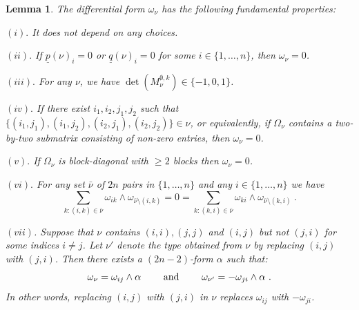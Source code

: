 \documentclass[10pt]{amsart}
\newcommand{\pp}{{\underline{p}}}
\newcommand{\qq}{{\underline{q}}}
\theoremstyle{plain}
\newtheorem{lem}[thm]{Lemma}
\newcommand{\0}{\color{blue}{\mathsf{0}}}
\begin{document}
\begin{lem}\label{onulem} The differential form $\omega_\nu$ has the following fundamental properties:

 $(i).$ It does not depend on any choices. 

 $(ii).$ If $\pp(\nu)_i=0$ or $\qq(\nu)_i=0$ for some $i\in\{1,\ldots,n\}$,
 then $\omega_\nu=0$.

 $(iii).$ For any $\nu$, we have $\det(M_{\nu}^{\emptyset,k})\in\{-1,0,1\}$.
 
 $(iv).$ If there exist $i_1,i_2, j_1,j_2$ such that 
$ \{ (i_1,j_1), (i_1,j_2), (i_2,j_1), (i_2,j_2)\} \in \nu $, or equivalently, if 
 $\Omega_\nu$ contains a two-by-two submatrix consisting of non-zero entries,  then $\omega_\nu=0$.

$(v).$ If $\Omega_\nu$ is block-diagonal with $\geq 2$ blocks then $\omega_\nu=0$.



$(vi).$ For any set $\bar\nu$ of $2n$ pairs in $\{1,\ldots,n\}$ and any
$i\in\{1,\ldots,n\}$ we have
\begin{equation}\label{Onubar1}
\sum_{k:(i,k)\in\bar\nu}\omega_{ik}\wedge\omega_{\bar\nu\setminus (i,k)}=0=\sum_{k:(k,i)\in\bar\nu}\omega_{ki}\wedge\omega_{\bar\nu\setminus (k,i)}\ .
\end{equation}

$(vii)$. Suppose that $\nu$ contains $(i,i), (j,j)$ and $(i,j)$ but not $(j,i)$ for some indices $i\neq j$. Let $\nu'$ denote the type  obtained from $\nu$ by replacing $(i,j)$ with $(j,i)$. Then  there exists a $(2n-2)$-form $\alpha$ such that: 
\begin{equation} \label{flipomegaij} \omega_{\nu} = \omega_{ij} \wedge \alpha  \qquad \hbox{ and } \qquad \omega_{\nu'} = -  \omega_{ji} \wedge \alpha\ .
\end{equation}
In other words,  replacing $(i,j)$ with $(j,i)$ in  $\nu$  replaces $\omega_{ij}$ with $-\omega_{ji}$.  
\end{lem}
\end{document}
